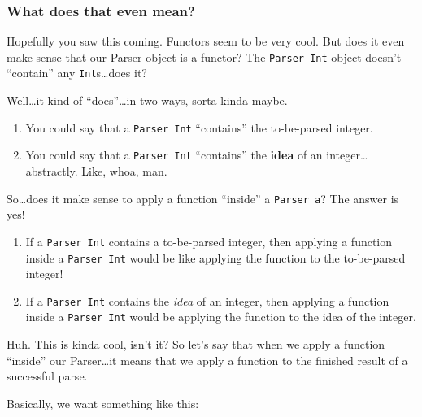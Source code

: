 \documentclass[]{article}
\newenvironment{Shaded}{}{}
\newcommand{\DataTypeTok}[1]{\textcolor[rgb]{0.56,0.13,0.00}{#1}}
\newcommand{\DecValTok}[1]{\textcolor[rgb]{0.25,0.63,0.44}{#1}}
\newcommand{\KeywordTok}[1]{\textcolor[rgb]{0.00,0.44,0.13}{\textbf{#1}}}
\newcommand{\NormalTok}[1]{#1}
\newcommand{\OperatorTok}[1]{\textcolor[rgb]{0.40,0.40,0.40}{#1}}
\newcommand{\OtherTok}[1]{\textcolor[rgb]{0.00,0.44,0.13}{#1}}
\newcommand{\StringTok}[1]{\textcolor[rgb]{0.25,0.44,0.63}{#1}}
\begin{document}
\hypertarget{what-does-that-even-mean}{%
\subsubsection{What does that even mean?}\label{what-does-that-even-mean}}

Hopefully you saw this coming. Functors seem to be very cool. But does it even
make sense that our Parser object is a functor? The \texttt{Parser\ Int} object
doesn't ``contain'' any \texttt{Int}s\ldots does it?

Well\ldots it kind of ``does''\ldots in two ways, sorta kinda maybe.

\begin{enumerate}
\def\labelenumi{\arabic{enumi}.}
\tightlist
\item
  You could say that a \texttt{Parser\ Int} ``contains'' the to-be-parsed
  integer.
\item
  You could say that a \texttt{Parser\ Int} ``contains'' the \textbf{idea} of an
  integer\ldots abstractly. Like, whoa, man.
\end{enumerate}

So\ldots does it make sense to apply a function ``inside'' a \texttt{Parser\ a}?
The answer is yes!

\begin{enumerate}
\def\labelenumi{\arabic{enumi}.}
\tightlist
\item
  If a \texttt{Parser\ Int} contains a to-be-parsed integer, then applying a
  function inside a \texttt{Parser\ Int} would be like applying the function to
  the to-be-parsed integer!
\item
  If a \texttt{Parser\ Int} contains the \emph{idea} of an integer, then
  applying a function inside a \texttt{Parser\ Int} would be applying the
  function to the idea of the integer.
\end{enumerate}

Huh. This is kinda cool, isn't it? So let's say that when we apply a function
``inside'' our Parser\ldots it means that we apply a function to the finished
result of a successful parse.

Basically, we want something like this:

\begin{Shaded}
\end{Shaded}
\end{document}
